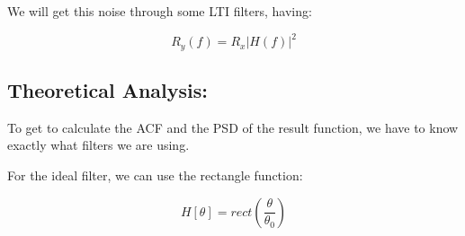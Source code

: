 \documentclass[a4paper,11pt]{article}
\begin{document}
We will get this noise through some LTI filters, having:

\begin{equation}R_y(f) = R_x |H(f)|^2\end{equation}

\newpage


\subsection{Theoretical Analysis:}

To get to calculate the ACF and the PSD of the result function, we have to know exactly what filters we are using.

For the ideal filter, we can use the rectangle function:

\begin{equation}H[\theta] = rect(\frac{\theta}{\theta_0})\end{equation}
\end{document}
